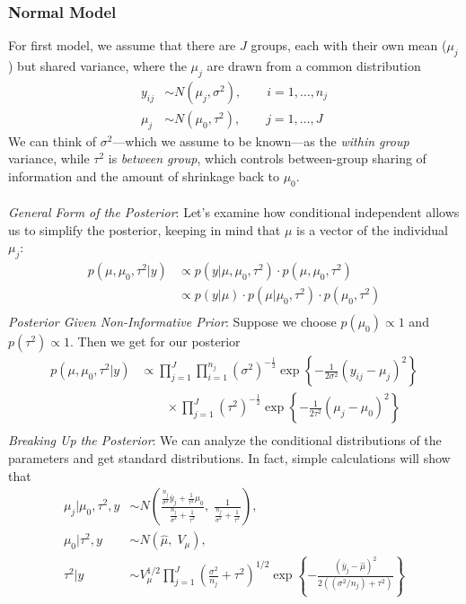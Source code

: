 \documentclass[12pt]{article}
\theoremstyle{plain}
\theoremstyle{definition}
\theoremstyle{remark}
\begin{document}
\newpage
\subsubsection{Normal Model}

For first model, we assume that there are $J$ groups, each with their
own mean ($\mu_j$) but shared variance, where the $\mu_j$ are drawn
from a common distribution
\begin{align*}
   y_{ij} &\sim N(\mu_j, \sigma^2), \qquad i = 1, \ldots, n_j \\
   \mu_j &\sim N(\mu_0, \tau^2), \qquad j = 1, \ldots, J
\end{align*}
We can think of $\sigma^2$---which we assume to be known---as the
\emph{within group} variance, while $\tau^2$ is \emph{between group},
which controls between-group sharing of information
and the amount of shrinkage back to $\mu_0$.
\\
\\
{\sl General Form of the Posterior}: Let's examine how conditional
independent allows us to simplify the posterior, keeping in mind
that $\mu$ is a vector of the individual $\mu_j$:
\begin{align*}
   p(\mu, \mu_0, \tau^2 | y) &\propto p(y | \mu, \mu_0, \tau^2 )\cdot
      p( \mu, \mu_0, \tau^2 ) \\
   &\propto p(y | \mu ) \cdot p( \mu | \mu_0, \tau^2 ) \cdot
      p( \mu_0, \tau^2 )\\
\end{align*}
{\sl Posterior Given Non-Informative Prior}: Suppose we choose
$p(\mu_0) \propto 1$ and $p(\tau^2) \propto 1$. Then we get for our
posterior
\begin{align*}
   p(\mu,\mu_0,\tau^2 | y) &\propto \prod^J_{j=1} \prod^{n_j}_{i=1}
      (\sigma^2)^{-\frac{1}{2}} \exp \left\{ -\frac{1}{2\sigma^2}
      (y_{ij} - \mu_j)^2\right\}  \\ 
      &\qquad \times \prod^J_{j=1}
      (\tau^2)^{-\frac{1}{2}} \exp\left\{-\frac{1}{2\tau^2}(\mu_j -
      \mu_0)^2\right\} \\
\end{align*}
{\sl Breaking Up the Posterior}:
We can analyze the conditional distributions of the parameters and
get standard distributions. In fact, simple calculations will show that
\begin{align*}
   \mu_j | \mu_0, \tau^2, y &\sim N\left(\frac{
      \frac{n_j}{\sigma^2} \bar{y}_j
      + \frac{1}{\tau^2}\mu_0}{\frac{n_j}{\sigma^2} + \frac{1}{\tau^2}},
      \; \frac{1}{ \frac{n_j}{\sigma^2} + \frac{1}{\tau^2}} \right),
      \\
   \mu_0 | \tau^2, y &\sim N\left( \hat{\mu},
      \;V_\mu\right),\\
   \tau^2 | y &\sim V^{1/2}_\mu \prod^J_{j=1} \left(
   \frac{\sigma^2}{n_j} + \tau^2\right)^{1/2}
   \exp \left\{ -\frac{(\bar{y}_j
   -\hat{\mu})^2}{2 \left( (\sigma^2/n_j) + \tau^2\right)}
   \right\}
\end{align*}
\end{document}
